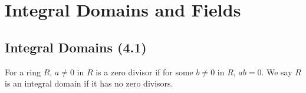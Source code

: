 \section{Integral Domains and Fields}

\subsection{Integral Domains (4.1)} \label{4.1}

For a ring $R$, $a \neq 0$ in $R$ is a zero divisor if for some 
$b \neq 0$ in $R$, $ab = 0$. We say $R$ is an integral domain if it has
no zero divisors.

